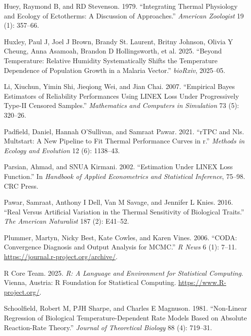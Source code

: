 \documentclass[
  12pt,
]{article}
\newlength{\cslhangindent}
\newenvironment{CSLReferences}[2] %
 {\begin{list}{}{%
  \setlength{\itemindent}{0pt}
  \setlength{\leftmargin}{0pt}
  \setlength{\parsep}{0pt}
  \ifodd #1
   \setlength{\leftmargin}{\cslhangindent}
   \setlength{\itemindent}{-1\cslhangindent}
  \fi
  \setlength{\itemsep}{#2\baselineskip}}}
 {\end{list}}
\begin{document}
\begin{CSLReferences}{1}{0}
Huey, Raymond B, and RD Stevenson. 1979. {``Integrating Thermal
Physiology and Ecology of Ectotherms: A Discussion of Approaches.''}
\emph{American Zoologist} 19 (1): 357--66.

Huxley, Paul J, Joel J Brown, Brandy St. Laurent, Britny Johnson, Olivia
Y Cheung, Anna Asamoah, Brandon D Hollingsworth, et al. 2025. {``Beyond
Temperature: Relative Humidity Systematically Shifts the Temperature
Dependence of Population Growth in a Malaria Vector.''} \emph{bioRxiv},
2025--05.

Li, Xiuchun, Yimin Shi, Jieqiong Wei, and Jian Chai. 2007. {``Empirical
Bayes Estimators of Reliability Performances Using LINEX Loss Under
Progressively Type-II Censored Samples.''} \emph{Mathematics and
Computers in Simulation} 73 (5): 320--26.

Padfield, Daniel, Hannah O'Sullivan, and Samraat Pawar. 2021. {``rTPC
and Nls. Multstart: A New Pipeline to Fit Thermal Performance Curves in
r.''} \emph{Methods in Ecology and Evolution} 12 (6): 1138--43.

Parsian, Ahmad, and SNUA Kirmani. 2002. {``Estimation Under LINEX Loss
Function.''} In \emph{Handbook of Applied Econometrics and Statistical
Inference}, 75--98. CRC Press.

Pawar, Samraat, Anthony I Dell, Van M Savage, and Jennifer L Knies.
2016. {``Real Versus Artificial Variation in the Thermal Sensitivity of
Biological Traits.''} \emph{The American Naturalist} 187 (2): E41--52.

Plummer, Martyn, Nicky Best, Kate Cowles, and Karen Vines. 2006.
{``CODA: Convergence Diagnosis and Output Analysis for MCMC.''} \emph{R
News} 6 (1): 7--11. \url{https://journal.r-project.org/archive/}.

R Core Team. 2025. \emph{R: A Language and Environment for Statistical
Computing}. Vienna, Austria: R Foundation for Statistical Computing.
\url{https://www.R-project.org/}.

Schoolfield, Robert M, PJH Sharpe, and Charles E Magnuson. 1981.
{``Non-Linear Regression of Biological Temperature-Dependent Rate Models
Based on Absolute Reaction-Rate Theory.''} \emph{Journal of Theoretical
Biology} 88 (4): 719--31.


\end{CSLReferences}
\end{document}
